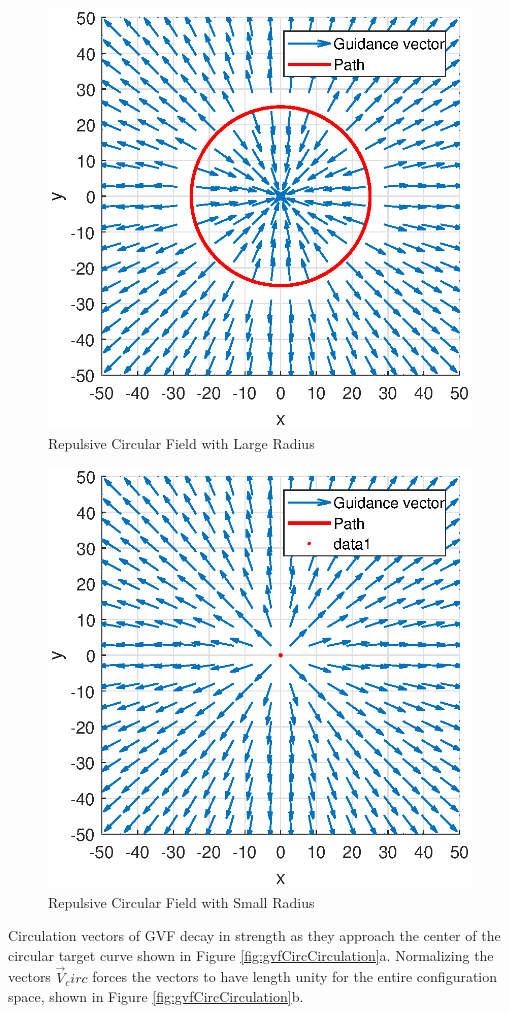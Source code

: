 \documentclass[numbered,pdftex]{ohio-etd}
\begin{document}
\begin{figure}[H]
	\centering
	\includegraphics[width=0.7\linewidth]{Figures/methods/largeRepulsive}
	\caption{Repulsive Circular Field with Large Radius}
	\label{fig:largerepulsive}
\end{figure}

\begin{figure}[H]
	\centering
	\includegraphics[width=0.7\linewidth]{Figures/methods/normalizedRepulsive}
	\caption{Repulsive Circular Field with Small Radius}
	\label{fig:normalizedrepulsive}
\end{figure}

Circulation vectors of GVF decay in strength as they approach the center of the circular target curve shown in Figure \ref{fig:gvfCircCirculation}a. Normalizing the vectors $\overrightarrow{V}_circ$ forces the vectors to have length unity for the entire configuration space, shown in Figure \ref{fig:gvfCircCirculation}b.
\end{document}
